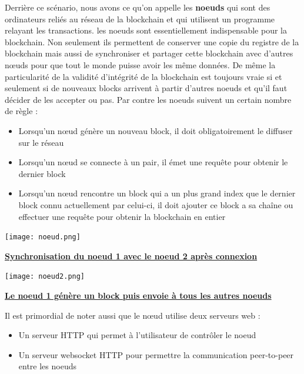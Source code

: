 \documentclass[12pt]{report}
\begin{document}
\hspace{1cm} Derrière ce scénario, nous avons ce qu'on appelle les \textbf{noeuds} qui sont des ordinateurs reliés au réseau de la blockchain et qui utilisent un programme relayant les transactions. les noeuds sont essentiellement indispensable pour la blockchain. Non seulement ils permettent de conserver une copie du registre de la blockchain mais aussi de synchroniser et partager cette blockchain avec d’autres nœuds pour que tout le monde puisse avoir les même données. De même la particularité de la validité d'intégrité de la blockchain est toujours vraie si et seulement si de nouveaux blocks arrivent à partir d'autres noeuds et qu'il faut décider de les accepter ou pas. Par contre les noeuds suivent un certain nombre de règle :
\begin{itemize}
    \item Lorsqu'un nœud génère un nouveau block, il doit obligatoirement le diffuser sur le réseau
    \item Lorsqu'un nœud se connecte à un pair, il émet une requête pour obtenir le dernier block
    \item Lorsqu'un nœud rencontre un block qui a un plus grand index que le dernier block connu actuellement par celui-ci, il doit ajouter ce block a sa chaîne ou effectuer une requête pour obtenir la blockchain en entier
\end{itemize}

\begin{center}
    \texttt{[image: noeud.png]}

    \textbf{\underline{Synchronisation du noeud 1 avec le noeud 2 après connexion}} \\[1cm]
\end{center}


\begin{center}
    \texttt{[image: noeud2.png]}

    \textbf{\underline{Le noeud 1 génère un block puis envoie à tous les autres noeuds }} \\[1cm]
\end{center}

\hspace{1cm} Il est primordial de noter aussi que le nœud utilise deux serveurs web : 
\begin{itemize}
    \item Un serveur HTTP qui permet à l'utilisateur de contrôler le noeud
    \item Un serveur websocket HTTP pour permettre la communication peer-to-peer entre les noeuds
\end{itemize} 
\end{document}

